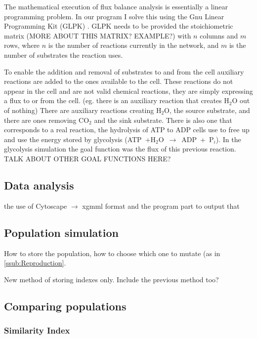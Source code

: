 \documentclass[10pt,a4paper]{article}
\begin{document}
	The mathematical execution of flux balance analysis is essentially a linear programming problem. In our program I solve this using the Gnu Linear Programming Kit (GLPK) \cite{glpk}. GLPK needs to be provided the stoichiometric matrix (MORE ABOUT THIS MATRIX? EXAMPLE?) with $n$ columns and $m$ rows, where $n$ is the number of reactions currently in the network, and $m$ is the number of substrates the reaction uses.  
	
	To enable the addition and removal of substrates to and from the cell auxiliary reactions are added to the ones available to the cell. These reactions do not appear in the cell and are not valid chemical reactions, they are simply expressing a flux to or from the cell. (eg. there is an auxiliary reaction that creates H$_2$O out of nothing) There are auxiliary reactions creating H$_2$O, the source substrate, and there are ones removing CO$_2$ and the sink substrate. There is also one that corresponds to a real reaction, the hydrolysis of ATP to ADP cells use to free up and use the energy stored by glycolysis (ATP~+H$_2$O~$\rightarrow$~ADP~+~P$_i$). In the glycolysis simulation the goal function was the flux of this previous reaction. 
	TALK ABOUT OTHER GOAL FUNCTIONS HERE?
\subsection{Data analysis}
\label{sub:visualization}

the use of Cytoscape $\rightarrow$ xgmml format and the  program part to output that

\subsection{Population simulation}
\label{sub:population_simulation}
How to store the population, how to choose which one to mutate (as in \ref{ssub:Reproduction}. 

New method of storing indexes only. Include the previous method too?



\subsection{Comparing populations}
\label{sub:comparing_populations}


\subsubsection{Similarity Index}
\label{ssub:Similarity Index}
\end{document}
